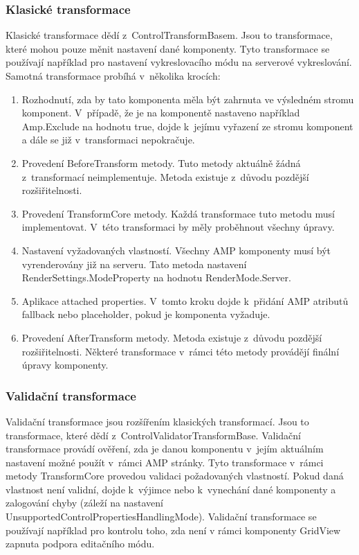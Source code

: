 \subsubsection{Klasické transformace}
    Klasické transformace dědí z~ControlTransformBasem. Jsou to transformace, které mohou pouze měnit nastavení dané komponenty. Tyto transformace se používají například pro nastavení vykreslovacího módu na serverové vykreslování. Samotná transformace probíhá v~několika krocích:
    \pagebreak
    \begin{enumerate}
        \item Rozhodnutí, zda by tato komponenta měla být zahrnuta ve výsledném stromu komponent.\newline
        V~případě, že je na komponentě nastaveno například Amp.Exclude na hodnotu true, dojde k~jejímu vyřazení ze stromu komponent a dále se již v~transformaci nepokračuje.
        \item Provedení BeforeTransform metody.\newline
        Tuto metody aktuálně žádná z~transformací neimplementuje. Metoda existuje z~důvodu pozdější rozšiřitelnosti.
        \item Provedení TransformCore metody.\newline
        Každá transformace tuto metodu musí implementovat. V~této transformaci by měly proběhnout všechny úpravy. 
        \item Nastavení vyžadovaných vlastností.\newline
        Všechny AMP komponenty musí být vyrenderovány již na serveru. Tato metoda nastavení RenderSettings.ModeProperty na hodnotu RenderMode.Server.
        \item Aplikace attached properties.\newline
        V~tomto kroku dojde k~přidání AMP atributů fallback nebo placeholder, pokud je komponenta vyžaduje.
        \item Provedení AfterTransform metody.\newline
        Metoda existuje z~důvodu pozdější rozšiřitelnosti. Některé transformace v~rámci této metody provádějí finální úpravy komponenty.
    \end{enumerate}
\subsubsection{Validační transformace}
    Validační transformace jsou rozšířením klasických transformací. Jsou to transformace, které dědí z~ControlValidatorTransformBase. Validační transformace provádí ověření, zda je danou komponentu v~jejím aktuálním nastavení možné použít v~rámci AMP stránky. Tyto transformace v~rámci metody TransformCore provedou validaci požadovaných vlastností. Pokud daná vlastnost není validní, dojde k~výjimce nebo k~vynechání dané komponenty a zalogování chyby (záleží na nastavení UnsupportedControlPropertiesHandlingMode). Validační transformace se používají například pro kontrolu toho, zda není v rámci komponenty GridView zapnuta podpora editačního módu.
